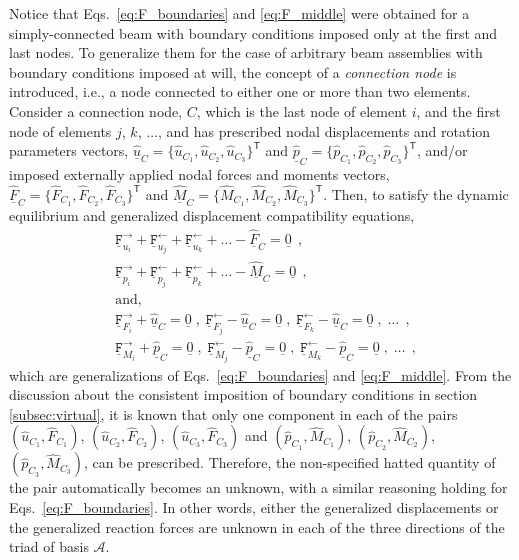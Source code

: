 \documentclass[12pt,a4paper,oneside,english]{abntex2} %
\newcommand{\vect}[1]{\underline{#1}}
\def\lp{\left(}
\def\rp{\right)}
\def\T{\mathsf{T}}
\def\A{\mathcal{A}}
\def\u{\vect{u}}
\def\uhat{\widehat{\u}}
\def\p{\vect{p}}
\def\phat{\widehat{\p}}
\def\F{\vect{F}}
\def\Fhat{\widehat{\F}}
\def\M{\vect{M}}
\def\Mhat{\widehat{\M}}
\def\zv{\vect{0}}
\def\Fupi{\mathtt{\vect{F}}_{u_i}^\rightarrow}
\def\Fumj{\mathtt{\vect{F}}_{u_j}^\leftarrow}
\def\Fumk{\mathtt{\vect{F}}_{u_k}^\leftarrow}
\def\Fppi{\mathtt{\vect{F}}_{p_i}^\rightarrow}
\def\Fpmj{\mathtt{\vect{F}}_{p_j}^\leftarrow}
\def\Fpmk{\mathtt{\vect{F}}_{p_k}^\leftarrow}
\def\FFpi{\mathtt{\vect{F}}_{F_i}^\rightarrow}
\def\FFmj{\mathtt{\vect{F}}_{F_j}^\leftarrow}
\def\FFmk{\mathtt{\vect{F}}_{F_k}^\leftarrow}
\def\FMpi{\mathtt{\vect{F}}_{M_i}^\rightarrow}
\def\FMmj{\mathtt{\vect{F}}_{M_j}^\leftarrow}
\def\FMmk{\mathtt{\vect{F}}_{M_k}^\leftarrow}
\begin{document}
Notice that Eqs.~\eqref{eq:F_boundaries} and \eqref{eq:F_middle} were obtained for a simply-connected beam with boundary conditions imposed only at the first and last nodes. To generalize them for the case of arbitrary beam assemblies with boundary conditions imposed at will, the concept of a \textit{connection node} is introduced, i.e., a node connected to either one or more than two elements. Consider a connection node, $C$, which is the last node of element $i$, and the first node of elements $j$, $k$, $\ldots$, and has prescribed nodal displacements and rotation parameters vectors, $\uhat_C=\{\widehat{u}_{C_1},\widehat{u}_{C_2},\widehat{u}_{C_3}\}^\T$ and $\phat_C=\{\widehat{p}_{C_1},\widehat{p}_{C_2},\widehat{p}_{C_3}\}^\T$, and/or imposed externally applied nodal forces and moments vectors, $\Fhat_C=\{\widehat{F}_{C_1},\widehat{F}_{C_2},\widehat{F}_{C_3}\}^\T$ and $\Mhat_C=\{\widehat{M}_{C_1},\widehat{M}_{C_2},\widehat{M}_{C_3}\}^\T$. Then, to satisfy the dynamic equilibrium and generalized displacement compatibility equations,
\begin{equation}
    \begin{aligned}
        &\Fupi + \Fumj + \Fumk + \ldots - \Fhat_C = \zv \ \ ,
        \\
        &\Fppi + \Fpmj + \Fpmk + \ldots - \Mhat_C = \zv \ \ ,
        \\
        &\text{and,}
        \\
        &\FFpi + \uhat_C = \zv \;,\; \FFmj - \uhat_C = \zv \;,\; \FFmk - \uhat_C = \zv \;,\; \ldots \ \ ,
        \\
        &\FMpi + \phat_C = \zv \;,\; \FMmj - \phat_C = \zv \;,\; \FMmk - \phat_C = \zv \;,\; \ldots \ \ ,
        \label{eq:F_connection_node}
    \end{aligned}
\end{equation}
which are generalizations of Eqs.~\eqref{eq:F_boundaries} and \eqref{eq:F_middle}. From the discussion about the consistent imposition of boundary conditions in section \ref{subsec:virtual}, it is known that only one component in each of the pairs $\lp \widehat{u}_{C_1}, \widehat{F}_{C_1} \rp$, $\lp \widehat{u}_{C_2}, \widehat{F}_{C_2} \rp$, $\lp \widehat{u}_{C_3}, \widehat{F}_{C_3} \rp$ and $\lp \widehat{p}_{C_1}, \widehat{M}_{C_1} \rp$, $\lp \widehat{p}_{C_2}, \widehat{M}_{C_2} \rp$, $\lp \widehat{p}_{C_3}, \widehat{M}_{C_3} \rp$, can be prescribed. Therefore, the non-specified hatted quantity of the pair automatically becomes an unknown, with a similar reasoning holding for Eqs.~\eqref{eq:F_boundaries}. In other words, either the generalized displacements or the generalized reaction forces are unknown in each of the three directions of the triad of basis $\A$. 
\end{document}
